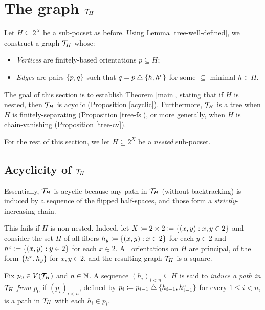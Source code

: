 \documentclass{amsart}
\begin{document}
    \section{The graph $\mathcal{T}_H$}

    Let $H\subseteq2^X$ be a sub-pocset as before. Using Lemma \ref{tree-well-defined}, we construct a graph $\mathcal{T}_H$ whose:
    \begin{itemize}
        \item \textit{Vertices} are finitely-based orientations $p\subseteq H$;
        \item \textit{Edges} are pairs $\left\{p,q\right\}$ such that $q=p\bigtriangleup\left\{h,h^c\right\}$ for some $\subseteq$-minimal $h\in H$.
    \end{itemize}

    The goal of this section is to establish Theorem \ref{main}, stating that if $H$ is nested, then $\mathcal{T}_H$ is acyclic (Proposition \ref{acyclic}). Furthermore, $\mathcal{T}_H$ is a tree when $H$ is finitely-separating (Proposition \ref{tree-fs}), or more generally, when $H$ is chain-vanishing (Proposition \ref{tree-cv}).

    For the rest of this section, we let $H\subseteq2^X$ be a \textit{nested} sub-pocset.

    \subsection{Acyclicity of $\mathcal{T}_H$}

    Essentially, $\mathcal{T}_H$ is acyclic because any path in $\mathcal{T}_H$ (without backtracking) is induced by a sequence of the flipped half-spaces, and those form a \textit{strictly}-increasing chain.

    \begin{example}
        This fails if $H$ is non-nested. Indeed, let $X\coloneqq2\times2\coloneqq\left\{(x,y): x,y\in2\right\}$ and consider the set $H$ of all fibers $h_y\coloneqq\left\{(x,y): x\in2\right\}$ for each $y\in2$ and $h^x\coloneqq\left\{(x,y): y\in2\right\}$ for each $x\in2$. All orientations on $H$ are principal, of the form $\left\{h^x,h_y\right\}$ for $x,y\in2$, and the resulting graph $\mathcal{T}_H$ is a square.
    \end{example}

    \begin{definition}
        Fix $p_0\in V(\mathcal{T}_H)$ and $n\in\mathbb{N}$. A sequence $(h_i)_{i<n}\subseteq H$ is said to \textit{induce a path in $\mathcal{T}_H$ from $p_0$} if $(p_i)_{i<n}$, defined by $p_i\coloneqq p_{i-1}\bigtriangleup\{h_{i-1},h_{i-1}^c\}$ for every $1\leq i<n$, is a path in $\mathcal{T}_H$ with each $h_i\in p_i$.
    \end{definition}
\end{document}
